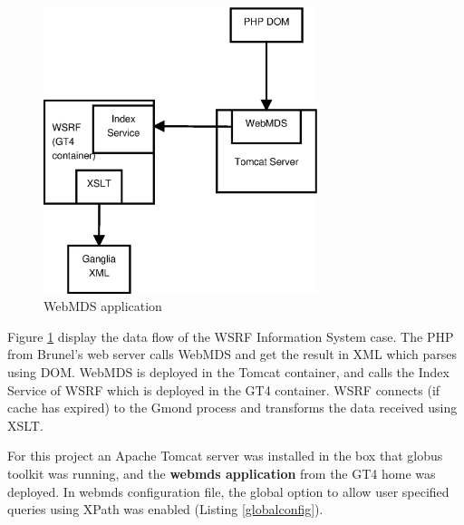 \begin{figure}[htb]
\centering
 \includegraphics[width=80mm]{images/webmds.eps}
\caption{WebMDS application}
\label{figure:webmds}
\end{figure}

Figure \ref{figure:webmds} display the data flow of the WSRF Information System case. The PHP from Brunel's web server calls WebMDS and get the result in XML which parses using DOM. WebMDS is deployed in the Tomcat container, and calls the Index Service of WSRF which is deployed in the GT4 container. WSRF connects (if cache has expired) to the Gmond process and transforms the data received using XSLT.

For this project an Apache Tomcat server was installed in the box that globus toolkit was running, and the {\bf webmds application} from the GT4 home was deployed. In webmds configuration file, the global option to allow user specified queries using XPath was enabled (Listing \ref{globalconfig}).
